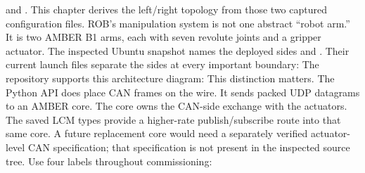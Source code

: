 \markdownRendererDocumentBegin
\markdownRendererSectionBegin
{}\markdownRendererInterblockSeparator
{}\markdownRendererBlockQuoteBegin
{}  and . This chapter derives the left/right topology from those two captured configuration files.\markdownRendererBlockQuoteEnd \markdownRendererInterblockSeparator
{}ROB's manipulation system is not one abstract “robot arm.” It is two AMBER B1 arms, each with seven revolute joints and a gripper actuator. The inspected Ubuntu snapshot names the deployed sides  and . Their current launch files separate the sides at every important boundary:\markdownRendererInterblockSeparator
{}\markdownRendererInterblockSeparator
{}The repository supports this architecture diagram:\markdownRendererInterblockSeparator
{}\markdownRendererInterblockSeparator
{}This distinction matters. The Python API does  place CAN frames on the wire. It sends packed UDP datagrams to an AMBER core. The core owns the CAN-side exchange with the actuators. The saved LCM types provide a higher-rate publish/subscribe route into that same core. A future replacement core would need a separately verified actuator-level CAN specification; that specification is not present in the inspected source tree.\markdownRendererInterblockSeparator
{}\markdownRendererSectionBegin
{}\markdownRendererInterblockSeparator
{}Use four labels throughout commissioning:\markdownRendererInterblockSeparator
